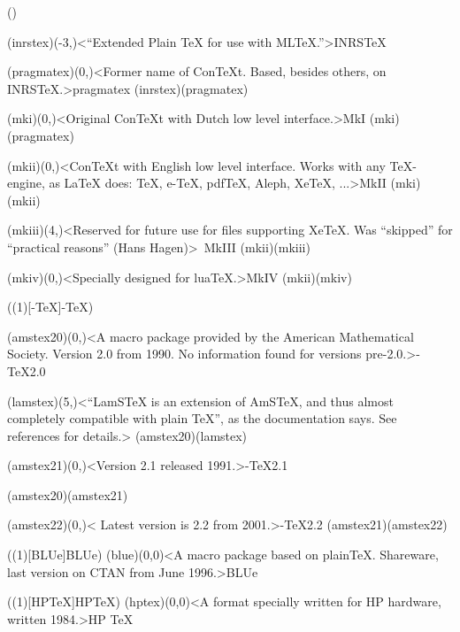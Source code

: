 \clearpage
\tograph*(){
	\tonode(inrstex)(-3,\layer)<“Extended Plain TeX for use with MLTeX.”>{INRS\TeX}
	\steplayer[-2]

	\tonode(pragmatex)(0,\layer)<Former name of ConTeXt. Based, besides others, on INRSTeX.>{pragmatex}
	\todraw(inrstex)(pragmatex)
	\steplayer[-2]

	\tonode(mki)(0,\layer)<Original ConTeXt with Dutch low level interface.>{\ConTeXt MkI}
	\todraw(mki)(pragmatex)
	\steplayer[-2]

	\tonode[\vip](mkii)(0,\layer)<ConTeXt with English low level interface. Works with any TeX-engine, as LaTeX does: TeX, e-TeX, pdfTeX, Aleph, XeTeX, ...>{\ConTeXt MkII}
	\todraw(mki)(mkii)
	\steplayer[-2]
	
	\tonode(mkiii)(4,\layer)<Reserved for future use for files supporting XeTeX. Was “skipped” for “practical reasons” (Hans Hagen)>{\ConTeXt\ MkIII}
	\todraw(mkii)(mkiii)
	\steplayer[-2]
	
	\tonode[\vip](mkiv)(0,\layer)<Specially designed for luaTeX.>{\ConTeXt MkIV}
	\todraw*(mkii)(mkiv)
}

\clearpage
\tograph(\tostruct(1)[\AMS-\TeX]{\AMS-\TeX}){
	\tonode(amstex20)(0,\layer)<A macro package provided by the American Mathematical Society. Version 2.0 from 1990. No information found for versions pre-2.0.>{\AMS-\TeX  2.0}
	\steplayer[-1]

	\tonode(lamstex)(5,\layer)<“LamSTeX{} is an extension of AmSTeX, and thus almost completely compatible with plain TeX”, as the documentation says. See references for details.>{}
	\todraw(amstex20)(lamstex)
	\steplayer[-1]

	\tonode(amstex21)(0,\layer)<Version 2.1 released 1991.>{\AMS-\TeX  2.1}

	\todraw(amstex20)(amstex21)
	\steplayer[-2]

	\tonode(amstex22)(0,\layer)< Latest version is 2.2 from 2001.>{\AMS-\TeX 2.2}
	\todraw(amstex21)(amstex22)
}

\tograph(\tostruct(1)[BLUe]{BLUe}){
	\tonode(blue)(0,0)<A macro package based on plainTeX. Shareware, last version on CTAN from June 1996.>{BLUe}
}

\tograph(\tostruct(1)[HP\TeX]{HP\TeX}){
	\tonode(hptex)(0,0)<A format specially written for HP hardware, written 1984.>{HP \TeX}
}

